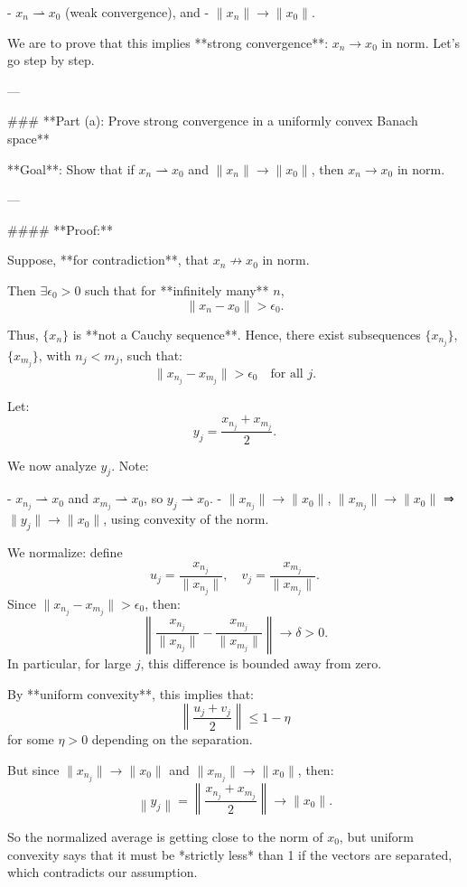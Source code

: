- \( x_n \rightharpoonup x_0 \) (weak convergence), and  
- \( \|x_n\| \to \|x_0\| \).

We are to prove that this implies **strong convergence**: \( x_n \to x_0 \) in norm. Let's go step by step.

---

### **Part (a): Prove strong convergence in a uniformly convex Banach space**

**Goal**: Show that if \( x_n \rightharpoonup x_0 \) and \( \|x_n\| \to \|x_0\| \), then \( x_n \to x_0 \) in norm.

---

#### **Proof:**

Suppose, **for contradiction**, that \( x_n \not\to x_0 \) in norm.

Then \( \exists \epsilon_0 > 0 \) such that for **infinitely many** \( n \),  
\[
\|x_n - x_0\| > \epsilon_0.
\]

Thus, \( \{x_n\} \) is **not a Cauchy sequence**. Hence, there exist subsequences \( \{x_{n_j}\} \), \( \{x_{m_j}\} \), with \( n_j < m_j \), such that:
\[
\|x_{n_j} - x_{m_j}\| > \epsilon_0 \quad \text{for all } j.
\]

Let:
\[
y_j = \frac{x_{n_j} + x_{m_j}}{2}.
\]

We now analyze \( y_j \). Note:

- \( x_{n_j} \rightharpoonup x_0 \) and \( x_{m_j} \rightharpoonup x_0 \), so \( y_j \rightharpoonup x_0 \).
- \( \|x_{n_j}\| \to \|x_0\| \), \( \|x_{m_j}\| \to \|x_0\| \) ⇒ \( \|y_j\| \to \|x_0\| \), using convexity of the norm.

We normalize: define
\[
u_j = \frac{x_{n_j}}{\|x_{n_j}\|}, \quad v_j = \frac{x_{m_j}}{\|x_{m_j}\|}.
\]
Since \( \|x_{n_j} - x_{m_j}\| > \epsilon_0 \), then:
\[
\left\| \frac{x_{n_j}}{\|x_{n_j}\|} - \frac{x_{m_j}}{\|x_{m_j}\|} \right\| \to \delta > 0.
\]
In particular, for large \( j \), this difference is bounded away from zero.

By **uniform convexity**, this implies that:
\[
\left\| \frac{u_j + v_j}{2} \right\| \leq 1 - \eta
\]
for some \( \eta > 0 \) depending on the separation.

But since \( \|x_{n_j}\| \to \|x_0\| \) and \( \|x_{m_j}\| \to \|x_0\| \), then:
\[
\left\| y_j \right\| = \left\| \frac{x_{n_j} + x_{m_j}}{2} \right\| \to \|x_0\|.
\]

So the normalized average is getting close to the norm of \( x_0 \), but uniform convexity says that it must be *strictly less* than 1 if the vectors are separated, which contradicts our assumption.

